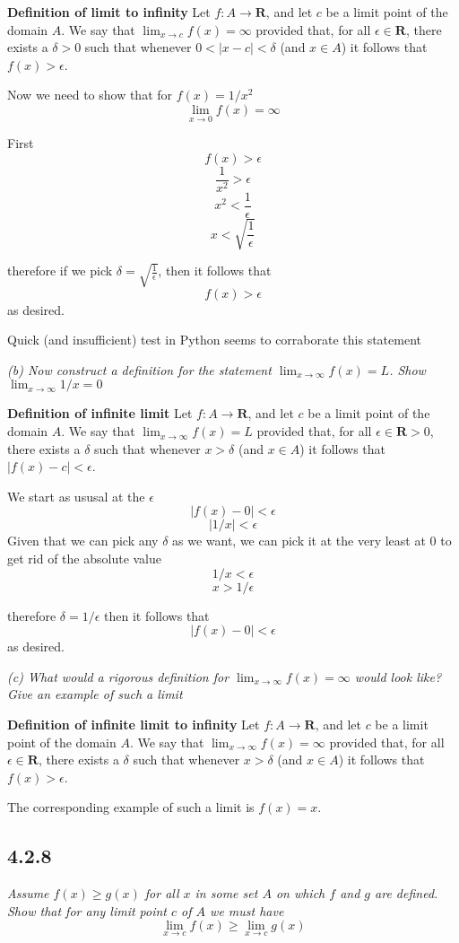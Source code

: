 \documentclass[11pt,oneside,titlepage]{book}
\begin{document}
\textbf{Definition of limit to infinity}
Let $f : A \to \textbf{R}$, and let $c$ be a limit point of the domain $A$. We say that
$\lim_{x\to c} f(x) = \infty$ provided that, for all $\epsilon \in \textbf{R}$, there exists
a $\delta > 0$ such that whenever $0 < |x - c| < \delta$ (and $x \in A$) it follows
that $f(x) > \epsilon$.

Now we need to show that for  $f(x) = 1/x^2$
$$\lim_{x \to 0}f(x) = \infty$$

First
$$ f(x) > \epsilon$$
$$ \frac{1}{x^2} > \epsilon$$
$$ x^2 < \frac{1}{\epsilon}$$
$$ x < \sqrt{\frac{1}{\epsilon}}$$

therefore if we pick $\delta = \sqrt{\frac{1}{\epsilon}}$, then it follows that
$$ f(x) > \epsilon$$
as desired.

Quick (and insufficient) test in Python seems to corraborate  this statement

\textit{(b) Now construct a definition for the statement $\lim_{x \to \infty} f(x) = L$. Show
$\lim_{x \to \infty} 1/x = 0$}

\textbf{Definition of infinite limit}
Let $f : A \to \textbf{R}$, and let $c$ be a limit point of the domain $A$. We say that
$\lim_{x \to \infty} f(x) = L$ provided that, for all $\epsilon \in \textbf{R} > 0$, there exists
a $\delta$ such that whenever $x > \delta$ (and $x \in A$) it follows
that $|f(x) - c | < \epsilon$.

We start as ususal at the $\epsilon$
$$|f(x) - 0| < \epsilon$$
$$|1/x| < \epsilon$$
Given that we can pick any $\delta$ as we want, we can pick it at the very least at $0$ to get rid
of the absolute value
$$1/x < \epsilon$$
$$x > 1/\epsilon$$

therefore $\delta = 1/\epsilon$ then it follows that $$|f(x) - 0| < \epsilon$$ as desired.

\textit{(c) What would a rigorous definition for $\lim_{x \to \infty} f(x) = \infty$ would look like? Give an example of such a limit}

\textbf{Definition of infinite limit to infinity}
Let $f : A \to \textbf{R}$, and let $c$ be a limit point of the domain $A$. We say that
$\lim_{x \to \infty} f(x) = \infty$ provided that, for all $\epsilon \in \textbf{R}$, there exists
a $\delta$ such that whenever $x > \delta$ (and $x \in A$) it follows
that $f(x) > \epsilon$.

The corresponding example of such a limit  is $f(x) = x$.

\subsection*{4.2.8}
\textit{Assume $f(x) \geq g(x)$ for all $x$ in some set $A$ on which $f$ and $g$ are defined. Show that for any limit point $c$ of $A$ we must have }
$$\lim_{x \to c} f(x) \geq \lim_{x \to c} g(x) $$
\end{document}
